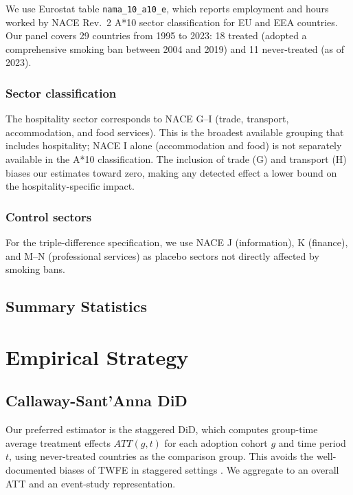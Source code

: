 \documentclass[12pt]{article}
\begin{document}
We use Eurostat table \texttt{nama\_10\_a10\_e}, which reports employment and hours worked by NACE Rev.~2 A*10 sector classification for EU and EEA countries. Our panel covers 29 countries from 1995 to 2023: 18 treated (adopted a comprehensive smoking ban between 2004 and 2019) and 11 never-treated (as of 2023).

\subsubsection*{Sector classification} The hospitality sector corresponds to NACE G--I (trade, transport, accommodation, and food services). This is the broadest available grouping that includes hospitality; NACE I alone (accommodation and food) is not separately available in the A*10 classification. The inclusion of trade (G) and transport (H) biases our estimates toward zero, making any detected effect a lower bound on the hospitality-specific impact.

\subsubsection*{Control sectors} For the triple-difference specification, we use NACE J (information), K (finance), and M--N (professional services) as placebo sectors not directly affected by smoking bans.

\subsection{Summary Statistics}




\section{Empirical Strategy}

\subsection{Callaway-Sant'Anna DiD}

Our preferred estimator is the \citet{callaway2021} staggered DiD, which computes group-time average treatment effects $ATT(g,t)$ for each adoption cohort $g$ and time period $t$, using never-treated countries as the comparison group. This avoids the well-documented biases of TWFE in staggered settings \citep{goodman2021, sun2021}. We aggregate to an overall ATT and an event-study representation.
\end{document}
